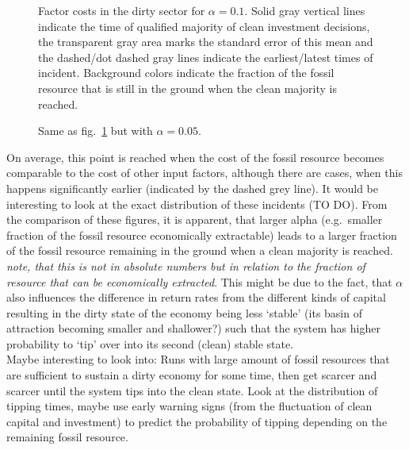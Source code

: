 \begin{figure}[t]
	\centering
	\caption{Factor costs in the dirty sector for $\alpha = 0.1$. Solid gray vertical lines indicate the time of qualified majority of clean investment decisions, the transparent gray area marks the standard error of this mean and the dashed/dot dashed gray lines indicate the earliest/latest times of incident. Background colors indicate the fraction of the fossil resource that is still in the ground when the clean majority is reached.}
	\label{fig:learning_dirty_cost0o1}
\end{figure}
\begin{figure}[t]
	\centering
	\caption{Same as fig.~\ref{fig:learning_dirty_cost0o1} but with $\alpha = 0.05$.}
	\label{fig:learning_dirty_cost0o05}
\end{figure}
On average, this point is reached when the cost of the fossil resource becomes comparable to the cost of other input factors, although there are cases, when this happens  significantly earlier (indicated by the dashed grey line). It would be interesting to look at the exact distribution of these incidents (TO DO).
From the comparison of these figures, it is apparent, that larger alpha (e.g.\ smaller fraction of the fossil resource economically extractable) leads to a larger fraction of the fossil resource remaining in the ground when a clean majority is reached. \textit{note, that this is not in absolute numbers but in relation to the fraction of resource that can be economically extracted}.
This might be due to the fact, that $\alpha$ also influences the difference in return rates from the different kinds of capital resulting in the dirty state of the economy being less `stable' (its basin of attraction becoming smaller and shallower?) such that the system has higher probability to `tip' over into its second (clean) stable state. \\

Maybe interesting to look into: Runs with large amount of fossil resources that are sufficient to sustain a dirty economy for some time, then get scarcer and scarcer until the system tips into the clean state. Look at the distribution of tipping times, maybe use early warning signs (from the fluctuation of clean capital and investment) to predict the probability of tipping depending on the remaining fossil resource.

